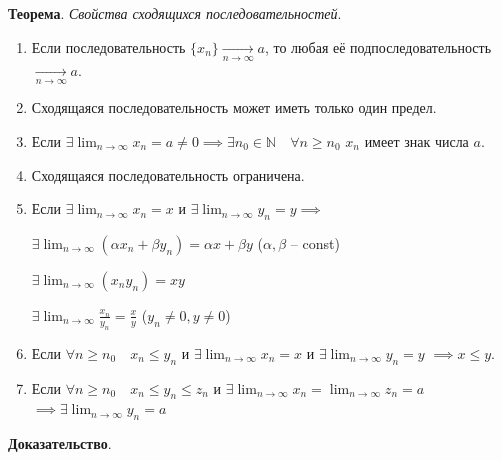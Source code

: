 \documentclass{article}
\newcommand{\parspace}{\vspace{10pt}}
\newcommand{\dslim}{\displaystyle\lim}
\newcommand{\dslimn}{\dslim_{n \to \infty}}
\theoremstyle{break}
\begin{document}
\parspace

\textbf{Теорема}. \textit{Свойства сходящихся последовательностей}.

\begin{enumerate}
    \item Если последовательность $\{x_n\} \underset{n \to \infty}{\to} a$,
    то любая её подпоследовательность $\underset{n \to \infty}{\to} a$.

    \item Сходящаяся последовательность может иметь только один предел.
    \item Если $\exists \dslimn x_n = a \ne 0 \implies
    \exists n_0 \in \mathbb{N} \quad \forall n \ge n_0$ $x_n$ имеет знак числа $a$.

    \item Сходящаяся последовательность ограничена.
    \item Если $\exists \dslimn x_n = x$ и
    $\exists \dslimn y_n = y \implies$

    $\exists \dslimn (\alpha x_n + \beta y_n) = \alpha x + \beta y$
    ($\alpha, \beta$ -- const)

    $\exists \dslimn (x_n y_n) = x y$

    $\exists \dslimn \frac{x_n}{y_n} = \frac{x}{y}$
    ($y_n \ne 0, y \ne 0$)

    \item Если $\forall n \ge n_0 \quad x_n \le y_n$ и 
    $\exists \dslimn x_n = x$ и
    $\exists \dslimn y_n = y$ $\implies x \le y$.

    \item Если $\forall n \ge n_0 \quad x_n \le y_n \le z_n$ и
    $\exists \dslimn x_n = 
    \dslimn z_n = a$
    $\implies \exists \dslimn y_n = a$
\end{enumerate}

\textbf{Доказательство}.
\end{document}
